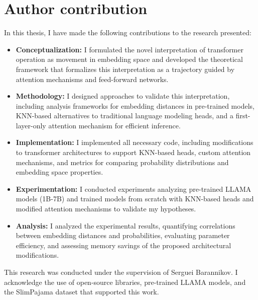 \chapter{Author contribution}

In this thesis, I have made the following contributions to the research presented:

\begin{itemize}
    \item \textbf{Conceptualization:} I formulated the novel interpretation of transformer operation as movement in embedding space and developed the theoretical framework that formalizes this interpretation as a trajectory guided by attention mechanisms and feed-forward networks.
    
    \item \textbf{Methodology:} I designed approaches to validate this interpretation, including analysis frameworks for embedding distances in pre-trained models, KNN-based alternatives to traditional language modeling heads, and a first-layer-only attention mechanism for efficient inference.
    
    \item \textbf{Implementation:} I implemented all necessary code, including modifications to transformer architectures to support KNN-based heads, custom attention mechanisms, and metrics for comparing probability distributions and embedding space properties.
    
    \item \textbf{Experimentation:} I conducted experiments analyzing pre-trained LLAMA models (1B-7B) and trained models from scratch with KNN-based heads and modified attention mechanisms to validate my hypotheses.
    
    \item \textbf{Analysis:} I analyzed the experimental results, quantifying correlations between embedding distances and probabilities, evaluating parameter efficiency, and assessing memory savings of the proposed architectural modifications.
\end{itemize}

This research was conducted under the supervision of Serguei Barannikov. I acknowledge the use of open-source libraries, pre-trained LLAMA models, and the SlimPajama dataset that supported this work.
